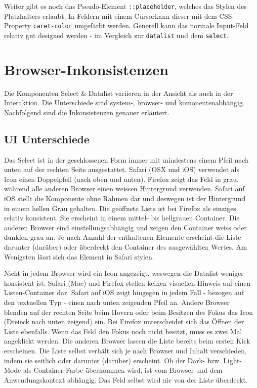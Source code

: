 Weiter gibt es noch das Pseudo-Element \texttt{::placeholder}, welches das Stylen des Platzhalters erlaubt.
In Feldern mit einem Cursor\footnotemark kann dieser mit dem CSS-Property \texttt{caret-color} umgefärbt werden.
Generell kann das normale Input-Feld relativ gut designed werden - im Vergleich zur \texttt{datalist} und dem \texttt{select}.


\clearpage
\section{Browser-Inkonsistenzen}
\label{sec:browserInconsistency}

Die Komponenten Select \& Datalist variieren in der Ansicht als auch in der Interaktion. 
Die Unterschiede sind system-, browser- und komonentenabhängig. 
Nachfolgend sind die Inkonsistenzen genauer erläutert. 


\subsection{UI Unterschiede}
\label{sec:uiDifferences}

Das Select ist in der geschlossenen Form immer mit mindestens einem Pfeil nach unten auf der rechten Seite ausgestattet.
Safari (OSX und iOS) verwendet als Icon einen Doppelpfeil (nach oben und unten).
Firefox zeigt das Feld in grau, während alle anderen Browser einen weissen Hintergrund verwenden.
Safari auf iOS stellt die Komponente ohne Rahmen dar und deswegen ist der Hintergrund in einem hellen Grau gehalten.
Die geöffnete Liste ist bei Firefox als einziges relativ konsistent. 
Sie erscheint in einem mittel- bis hellgrauen Container.
Die anderen Browser sind einstellungsabhängig und zeigen den Container weiss oder dunklen grau an.
Je nach Anzahl der enthaltenen Elemente erscheint die Liste darunter (darüber) oder überdeckt den Container des ausgewählten Wertes.
Am Wenigsten lässt sich das Element in Safari stylen.

Nicht in jedem Browser wird ein Icon angezeigt, weswegen die Datalist weniger konsistent ist.
Safari (Mac) und Firefox stellen keinen visuellen Hinweis auf einen Listen-Container dar.
Safari auf iOS zeigt hingegen in jedem Fall - bezogen auf den textuellen Typ - einen nach unten zeigenden Pfeil an.
Andere Browser blenden auf der rechten Seite beim Hovern oder beim Besitzen des Fokus das Icon (Dreieck nach unten zeigend) ein.
Bei Firefox unterscheidet sich das Öffnen der Liste ebenfalls. 
Wenn das Feld den Fokus noch nicht besitzt, muss es zwei Mal angeklickt werden.
Die anderen Browser lassen die Liste bereits beim ersten Kick erscheinen.
Die Liste selbst verhält sich je nach Browser und Inhalt verschieden, indem sie seitlich oder darunter (darüber) erscheint.
Ob der Dark- bzw. Light-Mode als Container-Farbe übernommen wird, ist vom Browser und dem Anwendungskontext abhängig.
Das Feld selbst wird nie von der Liste überdeckt. 

